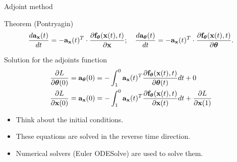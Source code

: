 \documentclass{beamer}
\begin{document}
\begin{frame}{Adjoint method}
	\begin{block}{Theorem (Pontryagin)}
		\vspace{-0.6cm}
		\[
		\frac{d \mathbf{a}_{\mathbf{x}}(t)}{dt} = - \mathbf{a}_{\mathbf{x}}(t)^T \cdot \frac{\partial \mathbf{f}_{\boldsymbol{\theta}}(\mathbf{x}(t), t)}{\partial \mathbf{x}}; \quad \frac{d \mathbf{a}_{\boldsymbol{\theta}}(t)}{dt} = - \mathbf{a}_{\mathbf{x}}(t)^T \cdot \frac{\partial \mathbf{f}_{\boldsymbol{\theta}}(\mathbf{x}(t),  t)}{\partial \boldsymbol{\theta}}.
		\]
		\vspace{-0.7cm}
	\end{block}
	\begin{block}{Solution for the adjoints function}
		\vspace{-0.5cm}
		\begin{align*}
			\frac{\partial L}{\partial \boldsymbol{\theta}(0)} &= \mathbf{a}_{\boldsymbol{\theta}}(0) =  - \int_{1}^{0} \mathbf{a}_{\mathbf{x}}(t)^T \frac{\partial \mathbf{f}_{\boldsymbol{\theta}}(\mathbf{x}(t), t)}{\partial \boldsymbol{\theta}(t)} dt + 0\\
			\frac{\partial L}{\partial \mathbf{x}(0)} &= \mathbf{a}_{\mathbf{x}}(0) =  - \int_{1}^{0} \mathbf{a}_{\mathbf{x}}(t)^T \frac{\partial \mathbf{f}_{\boldsymbol{\theta}}(\mathbf{x}(t), t)}{\partial \mathbf{x}(t)} dt + \frac{\partial L}{\partial \mathbf{x}(1)}
		\end{align*}
	\end{block}
	\begin{itemize}
		\item Think about the initial conditions.
		\item These equations are solved in the reverse time direction.
		\item Numerical solvers (Euler ODESolve) are used to solve them.
	\end{itemize}
\end{frame}
\end{document}
